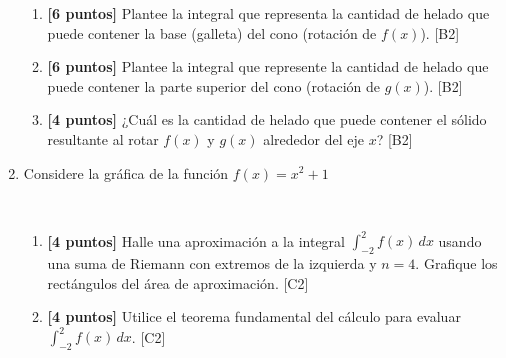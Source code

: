 \documentclass[10pt]{exam}
\begin{document}
\begin{enumerate}
\begin{enumerate}
   \item \textbf{[6 puntos]} Plantee la integral que representa la cantidad de helado que puede contener la  base (galleta) del cono (rotación de $f(x)$). \hfill{[B2]}

   \item \textbf{[6 puntos]} Plantee la integral que represente la cantidad de helado que puede contener la parte superior del cono (rotación de $g(x)$). \hfill{[B2]}
    
   \item \textbf{[4 puntos]} ¿Cuál es la cantidad de helado que puede contener el sólido resultante al rotar $f(x)$ y $g(x)$ alrededor del eje $x$?  \hfill{[B2]}
    
    
\end{enumerate}

\newpage
\item Considere la gráfica de la función $f(x)=x^2+1$

\begin{center}
\\

\end{center}



\begin{enumerate}
    \item \textbf{[4 puntos]}  Halle una aproximación a la integral     $\displaystyle{\int_{-2}^{2}f(x)\, dx}$ usando una suma de Riemann con extremos de la izquierda y $n=4$.  Grafique los rectángulos del área de aproximación. \hfill{[C2]}

   

     \item \textbf{[4 puntos]} Utilice el teorema fundamental del cálculo para evaluar  $\displaystyle{\int_{-2}^{2}f(x)\, dx}$. \hfill{[C2]}
     

\end{enumerate}
\end{enumerate}
\end{document}
